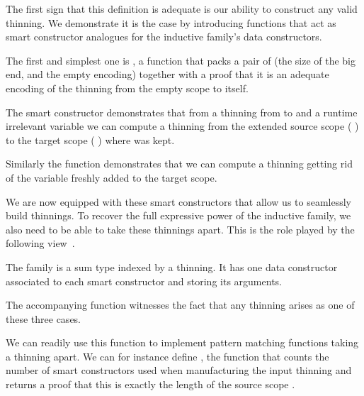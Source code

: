 \documentclass{article}
\begin{document}

The first sign that this definition is adequate is our ability to construct
any valid thinning. We demonstrate it is the case by introducing functions
that act as smart constructor analogues for the inductive family's data
constructors.

The first and simplest one is , a function that packs a pair of
 (the size of the big end, and the empty encoding) together with a proof
that it is an adequate encoding of the thinning from the empty scope to itself.


The  smart constructor demonstrates that from a thinning from
 to  and a runtime irrelevant variable 
we can compute a thinning from the extended source scope
( \IdrisData{:<} ) to the target scope
( \IdrisData{:<} ) where  was kept.


Similarly the  function demonstrates that we can compute a
thinning getting rid of the variable  freshly added to the target
scope.


We are now equipped with these smart constructors that allow us to seamlessly
build thinnings.
%
To recover the full expressive power of the inductive family, we also need to
be able to take these thinnings apart. This is the role played by the following
view~\cite{DBLP:journals/jfp/McBrideM04}.

The  family is a sum type indexed by a thinning. It has one
data constructor associated to each smart constructor and storing its arguments.


The accompanying  function witnesses the fact that any
thinning arises as one of these three cases.


We can readily use this function to implement pattern matching functions taking
a thinning apart. We can for instance define , the function
that counts the number of  smart constructors used when
manufacturing the input thinning and returns a proof that this is exactly the
length of the source scope .
\end{document}
